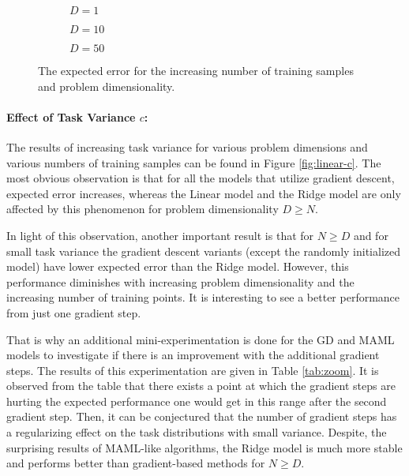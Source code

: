 \begin{figure}[!h]
  \centering
    \begin{subfigure}{0.32\textwidth}
      \centering
      \caption{$D=1$}
      \label{fig:linear-N-D-1}
    \end{subfigure}
    \begin{subfigure}{0.32\textwidth}
      \centering
      \caption{$D=10$}
      \label{fig:linear-N-D-10}
    \end{subfigure}
    \begin{subfigure}{0.32\textwidth}
      \centering
      \caption{$D=50$}
      \label{fig:linear-N-D-50}
    \end{subfigure}
  \caption{The expected error for the increasing number of training samples and problem dimensionality.}\label{fig:linear-N}
\end{figure}


\paragraph{Effect of Task Variance $c$:} The results of increasing task variance for various problem dimensions and various numbers of training samples can be found in Figure \ref{fig:linear-c}. The most obvious observation is that for all the models that utilize gradient descent, expected error increases, whereas the Linear model and the Ridge model are only affected by this phenomenon for problem dimensionality $D\geq N$.

In light of this observation, another important result is that for $N\geq D$ and for small task variance the gradient descent variants (except the randomly initialized model) have lower expected error than the Ridge model. However, this performance diminishes with increasing problem dimensionality and the increasing number of training points. It is interesting to see a better performance from just one gradient step. 

That is why an additional mini-experimentation is done for the GD and MAML models to investigate if there is an improvement with the additional gradient steps. The results of this experimentation are given in Table \ref{tab:zoom}. It is observed from the table that there exists a point at which the gradient steps are hurting the expected performance one would get in this range after the second gradient step. Then, it can be conjectured that the number of gradient steps has a regularizing effect on the task distributions with small variance. Despite, the surprising results of MAML-like algorithms, the Ridge model is much more stable and performs better than gradient-based methods for $N\geq D$.


